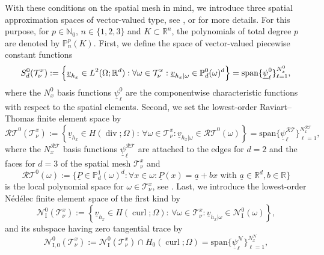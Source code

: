 \documentclass[a4paper,11pt]{article}
\newcommand{\N}{\mathbb N}
\newcommand{\R}{\mathbb R}
\newcommand{\cu}{\operatorname{curl}}
\newcommand{\di}{\operatorname{div}}
\renewcommand{\vec}[1]{\underline{#1}}
\begin{document}
With these conditions on the spatial mesh in mind, we introduce three spatial approximation spaces of vector-valued type, see \cite[Section~19.2]{ErnGuermond2020I}, \cite[Section~3.5.1]{logg2012automated} or \cite[Section~5.5]{Monk2003} for more details. For this purpose, for $p \in \N_0$, $n \in \{1,2,3\}$ and $K \subset \R^n$, the polynomials of total degree $p$ are denoted by $\mathbb P^p_n(K)$. First, we define the space of vector-valued piecewise constant functions
\begin{equation*}
	S_d^0(\mathcal T^x_\nu) := \Big\{ \vec v_{h_x} \in L^2(\Omega;\R^d) : \forall \omega \in \mathcal T^x_\nu: \vec v_{h_x|\omega} \in \mathbb P^0_d(\omega)^d \Big\} = \mathrm{span} \{\vec \psi_\ell^0 \}_{\ell=1}^{N_x^0}, \\
\end{equation*}
where the $N_x^0$ basis functions $\vec \psi_\ell^0$ are the componentwise characteristic functions with respect to the spatial elements. Second, we set the lowest-order Raviart--Thomas finite element space by
\begin{equation*}
	\mathcal{RT}^0(\mathcal T^x_\nu) := \left\{ \vec v_{h_x} \in H(\di;\Omega) : \, \forall \omega \in \mathcal T^x_\nu : \vec v_{h_x| \omega} \in \mathcal{RT}^0(\omega) \right\} = \mathrm{span} \{\vec \psi_\ell^{\mathcal{RT}} \}_{\ell=1}^{N_x^{\mathcal{RT}}},
\end{equation*}
where the $N_x^{\mathcal{RT}}$ basis functions $\vec \psi_\ell^{\mathcal{RT}}$ are attached to the edges for $d=2$ and the faces for $d=3$ of the spatial mesh $\mathcal T^x_\nu$ and
\begin{equation*}
	\mathcal{RT}^0(\omega) := \Big\{ \vec P \in \mathbb P^1_d(\omega)^d: \forall x \in \omega: \vec P(x) = \vec a + b x \text{ with } \vec a \in \R^d, b \in \R \Big\}
\end{equation*}
is the local polynomial space for $\omega \in \mathcal T^x_\nu$, see \cite[Section~14.1]{ErnGuermond2020I}. Last, we introduce the lowest-order Nédélec finite element space of the first kind by
\begin{equation*}
	\mathcal N_\mathrm{I}^0(\mathcal T^x_\nu) := \left\{ \vec v_{h_x} \in H(\cu;\Omega) : \, \forall \omega \in \mathcal T^x_\nu : \vec v_{h_x| \omega} \in \mathcal N_\mathrm{I}^0(\omega) \right\},
\end{equation*}
and its subspace having zero tangential trace by
\begin{equation*}
	\mathcal N_\mathrm{I,0}^0(\mathcal T^x_\nu) := \mathcal N_\mathrm{I}^0(\mathcal T^x_\nu) \cap H_0(\cu;\Omega) = \mathrm{span} \{\vec \psi_\ell^{\mathcal{N}} \}_{\ell=1}^{N_x^{\mathcal{N}}},
\end{equation*}
\end{document}
